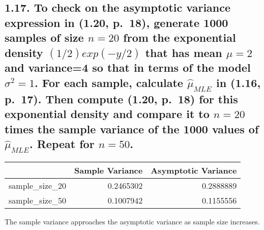 \documentclass[
  letterpaper,
  DIV=11,
  numbers=noendperiod]{scrreprt}
\begin{document}
\hypertarget{to-check-on-the-asymptotic-variance-expression-in-1.20-p.-18-generate-1000-samples-of-size-n20-from-the-exponential-density-12exp-y2-that-has-mean-mu2-and-variance4-so-that-in-terms-of-the-model-sigma21.-for-each-sample-calculate-hatmu_mle-in-1.16-p.-17.-then-compute-1.20-p.-18-for-this-exponential-density-and-compare-it-to-n20-times-the-sample-variance-of-the-1000-values-of-hatmu_mle.-repeat-for-n50.}{%
\subsection{\texorpdfstring{1.17. To check on the asymptotic variance
expression in (1.20, p.~18), generate 1000 samples of size \(n=20\) from
the exponential density \((1/2)exp(-y/2)\) that has mean \(\mu=2\) and
variance=4 so that in terms of the model \(\sigma^2=1\). For each
sample, calculate \(\hat{\mu}_{MLE}\) in (1.16, p.~17). Then compute
(1.20, p.~18) for this exponential density and compare it to \(n=20\)
times the sample variance of the 1000 values of \(\hat{\mu}_{MLE}\).
Repeat for
\(n=50\).}{1.17. To check on the asymptotic variance expression in (1.20, p.~18), generate 1000 samples of size n=20 from the exponential density (1/2)exp(-y/2) that has mean \textbackslash mu=2 and variance=4 so that in terms of the model \textbackslash sigma\^{}2=1. For each sample, calculate \textbackslash hat\{\textbackslash mu\}\_\{MLE\} in (1.16, p.~17). Then compute (1.20, p.~18) for this exponential density and compare it to n=20 times the sample variance of the 1000 values of \textbackslash hat\{\textbackslash mu\}\_\{MLE\}. Repeat for n=50.}}\label{to-check-on-the-asymptotic-variance-expression-in-1.20-p.-18-generate-1000-samples-of-size-n20-from-the-exponential-density-12exp-y2-that-has-mean-mu2-and-variance4-so-that-in-terms-of-the-model-sigma21.-for-each-sample-calculate-hatmu_mle-in-1.16-p.-17.-then-compute-1.20-p.-18-for-this-exponential-density-and-compare-it-to-n20-times-the-sample-variance-of-the-1000-values-of-hatmu_mle.-repeat-for-n50.}}

\begin{longtable}[]{@{}lrr@{}}
\toprule\noalign{}
& Sample Variance & Asymptotic Variance \\
\midrule\noalign{}
\endhead
\bottomrule\noalign{}
\endlastfoot
sample\_size\_20 & 0.2465302 & 0.2888889 \\
sample\_size\_50 & 0.1007942 & 0.1155556 \\
\end{longtable}

The sample variance approaches the asymptotic variance as sample size
increases.
\end{document}
